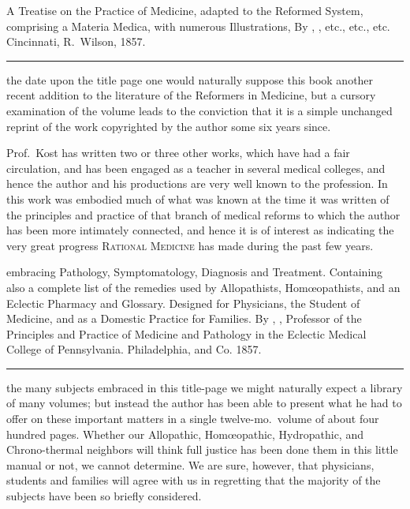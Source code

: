 
\smallornament
\footnotesize
{}  A Treatise on the Practice of Medicine, adapted to the Reformed
System, comprising a Materia Medica, with numerous Illustrations, By , \md, etc., etc., etc. Cincinnati, R.~Wilson, 1857.
\plainbreak{1}
\normalsize

 the date upon the title page one would naturally suppose this
book another recent addition to the literature of the Reformers in Medicine,
but a cursory examination of the volume leads to the conviction
that it is a simple unchanged reprint of the work copyrighted by the
author some six years since.

Prof.\ Kost has written two or three other works, which have had
a fair circulation, and has been engaged as a teacher in several
medical colleges, and hence the author and his productions are very
well known to the profession. In this work was embodied much of what
was known at the time it was written of the principles and practice of
that branch of medical reforms to which the author has been more intimately
connected, and hence it is of interest as indicating the very
great progress \textsc{Rational Medicine} has made during the past few years.

\smallornament
\footnotesize
{} embracing Pathology, Symptomatology,
Diagnosis and Treatment. Containing also a complete list of the remedies used
by Allopathists, Homœopathists, and an Eclectic Pharmacy and Glossary. Designed
for Physicians, the Student of Medicine, and as a Domestic Practice for Families. By
, \md, Professor of the Principles and Practice of Medicine and Pathology
in the Eclectic Medical College of Pennsylvania. Philadelphia, 
and Co. 1857.
\plainbreak{1}
\normalsize

 the many subjects embraced in this title-page we might naturally
expect a library of many volumes; but instead the author has been
able to present what he had to offer on these important matters in a
single twelve-mo.\ volume of about four hundred pages. Whether our
Allopathic, Homœopathic, Hydropathic, and Chrono-thermal neighbors
will think full justice has been done them in this little manual or not,
we cannot determine. We are sure, however, that physicians, students
and families will agree with us in regretting that the majority of the
subjects have been so briefly considered.

